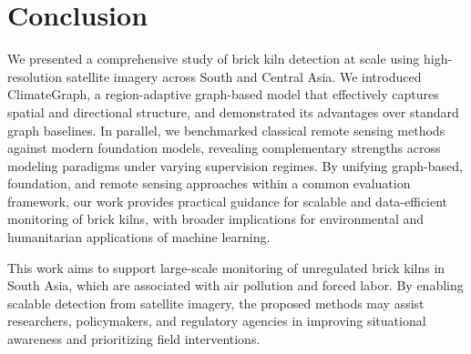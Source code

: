\documentclass{article}
\theoremstyle{plain}
\theoremstyle{definition}
\theoremstyle{remark}
\begin{document}





\section{Conclusion}
We presented a comprehensive study of brick kiln detection at scale using high-resolution satellite imagery across South and Central Asia. We introduced ClimateGraph, a region-adaptive graph-based model that effectively captures spatial and directional structure, and demonstrated its advantages over standard graph baselines. In parallel, we benchmarked classical remote sensing methods against modern foundation models, revealing complementary strengths across modeling paradigms under varying supervision regimes. By unifying graph-based, foundation, and remote sensing approaches within a common evaluation framework, our work provides practical guidance for scalable and data-efficient monitoring of brick kilns, with broader implications for environmental and humanitarian applications of machine learning.

This work aims to support large-scale monitoring of unregulated brick kilns in South Asia, which are associated with air pollution and forced labor. By enabling scalable detection from satellite imagery, the proposed methods may assist researchers, policymakers, and regulatory agencies in improving situational awareness and prioritizing field interventions. 
\end{document}
